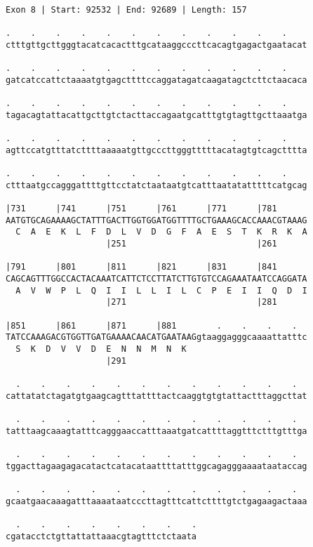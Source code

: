 \documentclass{article}
\begin{document}
\begin{Verbatim}
Exon 8 | Start: 92532 | End: 92689 | Length: 157
 
.    .    .    .    .    .    .    .    .    .    .    .    
ctttgttgcttgggtacatcacactttgcataaggcccttcacagtgagactgaatacat
  
.    .    .    .    .    .    .    .    .    .    .    .    
gatcatccattctaaaatgtgagcttttccaggatagatcaagatagctcttctaacaca
  
.    .    .    .    .    .    .    .    .    .    .    .    
tagacagtattacattgcttgtctacttaccagaatgcatttgtgtagttgcttaaatga
  
.    .    .    .    .    .    .    .    .    .    .    .    
agttccatgtttatcttttaaaaatgttgcccttgggtttttacatagtgtcagctttta
  
.    .    .    .    .    .    .    .    .    .    .    .    
ctttaatgccagggattttgttcctatctaataatgtcatttaatatatttttcatgcag
  
|731      |741      |751      |761      |771      |781      
AATGTGCAGAAAAGCTATTTGACTTGGTGGATGGTTTTGCTGAAAGCACCAAACGTAAAG
  C  A  E  K  L  F  D  L  V  D  G  F  A  E  S  T  K  R  K  A
                    |251                          |261      
  
|791      |801      |811      |821      |831      |841      
CAGCAGTTTGGCCACTACAAATCATTCTCCTTATCTTGTGTCCAGAAATAATCCAGGATA
  A  V  W  P  L  Q  I  I  L  L  I  L  C  P  E  I  I  Q  D  I
                    |271                          |281      
  
|851      |861      |871      |881        .    .    .    .  
TATCCAAAGACGTGGTTGATGAAAACAACATGAATAAGgtaaggagggcaaaattatttc
  S  K  D  V  V  D  E  N  N  M  N  K                        
                    |291                                    
  
  .    .    .    .    .    .    .    .    .    .    .    .  
cattatatctagatgtgaagcagtttattttactcaaggtgtgtattactttaggcttat
  
  .    .    .    .    .    .    .    .    .    .    .    .  
tatttaagcaaagtatttcagggaaccatttaaatgatcattttaggtttctttgtttga
  
  .    .    .    .    .    .    .    .    .    .    .    .  
tggacttagaagagacatactcatacataattttatttggcagagggaaaataataccag
  
  .    .    .    .    .    .    .    .    .    .    .    .  
gcaatgaacaaagatttaaaataatcccttagtttcattcttttgtctgagaagactaaa
  
  .    .    .    .    .    .    .    .
cgatacctctgttattattaaacgtagtttctctaata
\end{Verbatim}
\end{document}
